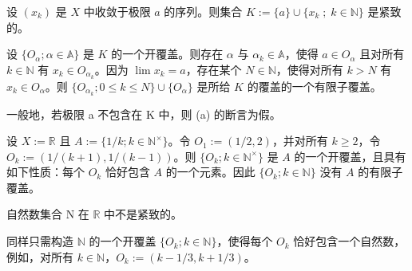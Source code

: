 \begin{example}

\begin{items}
\item

设 $ (x_k) $ 是 $ X $ 中收敛于极限 $ a $ 的序列。则集合 $ K := \{a\} \cup \{x_k\;;\;k \in \mathbb{N}\} $ 是紧致的。

\proofhead
设 $\{O_\alpha; \alpha \in \mathbb{A}\}$ 是 $K$ 的一个开覆盖。则存在 $\alpha$ 与 $\alpha_k \in \mathbb{A}$，使得 $a \in O_\alpha$ 且对所有 $k \in \mathbb{N}$ 有 $x_k \in O_{\alpha_k}$。因为 $\lim x_k = a$，存在某个 $N \in \mathbb{N}$，使得对所有 $k > N$ 有 $x_k \in O_\alpha$。则 $\{O_{\alpha_k}; 0 \leq k \leq N\} \cup \{O_\alpha\}$ 是所给 $K$ 的覆盖的一个有限子覆盖。
\item

一般地，若极限 a 不包含在 K 中，则 (a) 的断言为假。

\proofhead
设 $X := \mathbb{R}$ 且 $A := \{1/k; k \in \mathbb{N}^\times\}$。令 $O_1 := (1/2,2)$，并对所有 $k \geq 2$，令 $O_k := (1/(k+1), 1/(k-1))$。则 $\{O_k; k \in \mathbb{N}^\times\}$ 是 $A$ 的一个开覆盖，且具有如下性质：每个 $O_k$ 恰好包含 $A$ 的一个元素。因此 $\{O_k; k \in \mathbb{N}\}$ 没有 $A$ 的有限子覆盖。
\item

自然数集合 N 在 $ \mathbb{R} $ 中不是紧致的。

\proofhead
同样只需构造 $\mathbb{N}$ 的一个开覆盖 $\{O_k; k \in \mathbb{N}\}$，使得每个 $O_k$ 恰好包含一个自然数，例如，对所有 $k \in \mathbb{N}$，$O_k := (k - 1/3, k + 1/3)$。
\end{items}

\end{example}

